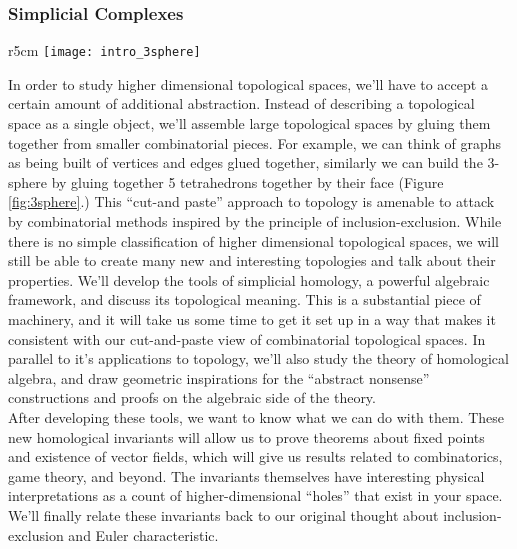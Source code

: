 \subsubsection{Simplicial Complexes}
\begin{wrapfigure}{r}{5cm}
	\centering
	\texttt{[image: intro\_3sphere]}
	\caption{A combinatorial description of the 3-sphere, with a single 3-simplex shaded in.}
	\label{fig:3sphere}
\end{wrapfigure}
In order to study higher dimensional  topological spaces, we'll have to accept a certain amount of additional abstraction. Instead of describing a topological space as a single object, we'll  assemble large topological spaces by gluing them together from smaller combinatorial pieces. For example, we can think of graphs as being built of vertices and edges glued together, similarly we can build the 3-sphere by gluing together 5 tetrahedrons together by their face (Figure \ref{fig:3sphere}.) This ``cut-and paste'' approach to topology is amenable to attack by combinatorial methods inspired by the principle of inclusion-exclusion. 
While there is no simple classification of higher dimensional topological spaces, we will still be able to create many new and interesting topologies and talk about their properties. We'll develop the tools of simplicial homology, a powerful algebraic framework, and discuss its topological meaning. This is a substantial piece of machinery, and it will take us some time to get it set up in a way that makes it consistent with our cut-and-paste view of combinatorial topological spaces. In parallel to it's applications to topology, we'll also study the theory of homological algebra, and draw geometric inspirations for the ``abstract nonsense'' constructions and proofs on the algebraic side of the theory. \\
After developing these tools, we want to  know what we can do with them. These new homological invariants will allow us to prove theorems about fixed points and existence of vector fields, which will give us results related to combinatorics, game theory, and beyond. The invariants themselves have interesting physical interpretations as a count of  higher-dimensional ``holes'' that exist in your space. We'll finally relate these invariants back to our original thought about inclusion-exclusion and Euler characteristic. 
